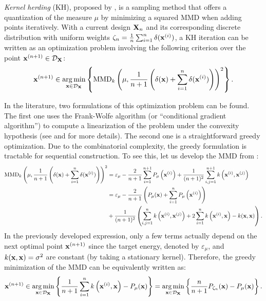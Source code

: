 \emph{Kernel herding} (KH), proposed by \cite{chen_welling_2010}, is a sampling method that offers a quantization of the measure $\mu$ by minimizing a squared MMD when adding points iteratively. 
With a current design ${\bf X}_n$ and its corresponding discrete distribution with uniform weights $\zeta_n= \frac{1}{n} \sum_{i=1}^{n} \delta({\bf x}^{(i)})$, a KH iteration can be written as an optimization problem involving the following criterion over the point ${\bf x}^{(n+1)} \in \mathcal{D}_{{\bf X}}$:
\begin{align}
   {\bf x}^{(n+1)} \in \operatorname*{arg\,min}_{{\bf x} \in \mathcal{D}_{{\bf X}}} \left\{\mathrm{MMD}_k\left(\mu, \frac{1}{n+1} \left(\delta({\bf x}) + \sum_{i=1}^{n} \delta({\bf x}^{(i)})\right)\right)^2\right\}.
   \label{eq:mmd_criterion}
\end{align}

In the literature, two formulations of this optimization problem can be found. 
The first one uses the Frank-Wolfe algorithm (or ``conditional gradient algorithm'') to compute a linearization of the problem under the convexity hypothesis (see \cite{lacoste_2015} and \cite{briol_2015} for more details). 
The second one is a straightforward greedy optimization. Due to the combinatorial complexity, the greedy formulation is tractable for sequential construction. 
To see this, let us develop the MMD from :
\begin{subequations}
\begin{align}
    \mathrm{MMD}_k\left(\mu, \frac{1}{n+1} \left(\delta({\bf x}) + \sum_{i=1}^{n} \delta({\bf x}^{(i)})\right)\right)^2
    &= \varepsilon_\mu - \frac{2}{n+1} \sum_{i=1}^{n+1} P_{\mu}\left({\bf x}^{(i)}\right) + \frac{1}{(n+1)^2} \sum_{i,j=1}^{n+1} k\left({\bf x}^{(i)}, {\bf x}^{(j)}\right)\\
    &= \varepsilon_\mu - \frac{2}{n+1} \left(P_\mu({\bf x}) + \sum_{i=1}^n P_{\mu}\left({\bf x}^{(i)}\right)\right)\\ &+ \frac{1}{(n+1)^2} \left(\sum_{i,j=1}^n k\left({\bf x}^{(i)}, {\bf x}^{(j)}\right) + 2\sum_{i=1}^n k\left({\bf x}^{(i)}, {\bf x}\right) - k({\bf x}, {\bf x}) \right).
\end{align}
\end{subequations}
In the previously developed expression, only a few terms actually depend on the next optimal point ${\bf x}^{(n+1)}$ since the target energy, denoted by $\varepsilon_\mu$, and $k({\bf x}, {\bf x})=\sigma^2$ are constant (by taking a stationary kernel). 
Therefore, the greedy minimization of the MMD can be equivalently written as: 
\begin{equation}\label{eq:greedy_formulation}
    {\bf x}^{(n+1)} \in \operatorname*{arg\,min}_{{\bf x} \in \mathcal{D}_{{\bf X}}} \left\{ \frac{1}{n+1} \sum_{i=1}^n k\left({\bf x}^{(i)}, {\bf x}\right) - P_\mu({\bf x}) \right\} = \operatorname*{arg\,min}_{{\bf x} \in \mathcal{D}_{{\bf X}}} \left\{ \frac{n}{n+1} P_{\zeta_n}({\bf x}) - P_{\mu}({\bf x})\right\}.
\end{equation}

